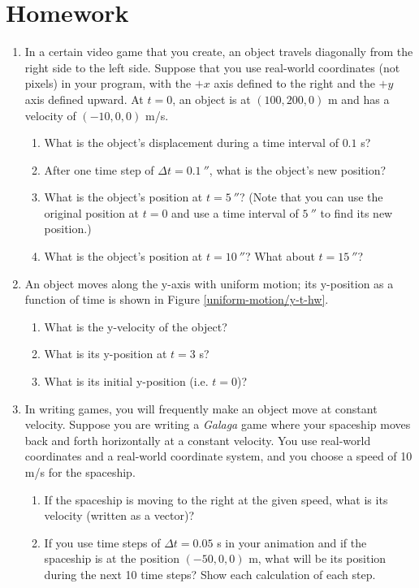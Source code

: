 \pagebreak

\section{Homework}

\begin{enumerate}
	\item In a certain video game that you create, an object travels diagonally from the right side to the left side. Suppose that you use real-world coordinates (not pixels) in your program, with the $+x$ axis defined to the right and the $+y$ axis defined upward. At $t=0$, an object is at $(100,200,0)$ m and has a velocity of $(-10,0,0)$ m/s. 
	
	\begin{enumerate}
		\item What is the object's displacement during a time interval of $0.1$ s?
		\item After one time step of $\Delta t=0.1\ \second$, what is the object's new position?
		\item What is the object's position at $t=5\ \second$? (Note that you can use the original position at $t=0$ and use a time interval of $5\ \second$ to find its new position.)
		\item What is the object's position at $t=10\ \second$? What about $t=15\ \second$?
	\end{enumerate}
	
	\item An object moves along the y-axis with uniform motion; its y-position as a function of time is shown in Figure \ref{uniform-motion/y-t-hw}.
	
	
	\begin{enumerate}
		\item What is the y-velocity of the object?
		\item What is its y-position at $t=3$ s?
		\item What is its initial y-position (i.e. $t=0$)?
	\end{enumerate}

	\item In writing games, you will frequently make an object move at constant velocity. Suppose you are writing a \emph{Galaga} game where your spaceship moves back and forth horizontally at a constant velocity. You use real-world coordinates and a real-world coordinate system, and you choose a speed of 10 m/s for the spaceship.
	\begin{enumerate}
		\item If the spaceship is moving to the right at the given speed, what is its velocity (written as a vector)?
		\item If you use time steps of $\Delta t=0.05$ s in your animation and if the spaceship is at the position $(-50,0,0)$ m, what will be its position during the next 10 time steps? Show each calculation of each step.
	\end{enumerate}
	
\end{enumerate}
